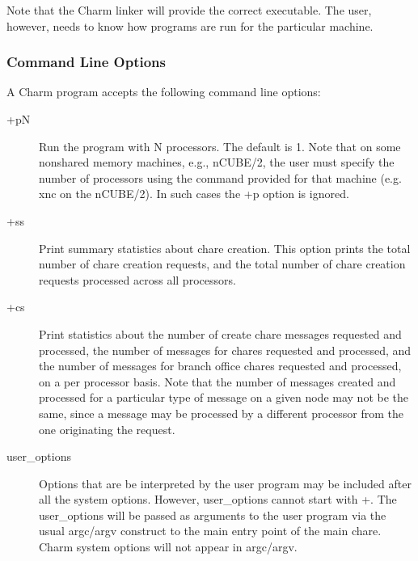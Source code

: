 Note that the Charm linker will provide the correct 
executable. The user, however, needs to know how programs are run for
the particular machine.

\subsubsection[Command Line Options]{Command Line Options}
\label{command line options}

A Charm program accepts the following command line options:
\begin{description}

\item[{\fexec +pN}] Run the program with N processors. The default is 1.
Note that on some nonshared memory machines, e.g., nCUBE/2, the user must
specify the number of processors using the command provided for that
machine (e.g. {\fexec xnc} on the nCUBE/2).
In such cases the {\fexec +p} option is ignored.



\item[{\fexec +ss}] Print summary statistics about chare creation.  This option
prints the total number of chare creation requests, and the total number of
chare creation requests processed across all processors.

\item[{\fexec +cs}] Print statistics about the number of create chare messages
requested and processed, the number of messages for chares requested and 
processed, and the number of messages for branch office chares requested and
processed, on a per processor basis.  Note that the number of messages 
created and processed for a particular type of message on a given node 
may not be the same, since a message may be processed by a different
processor from the one originating the request.


\item[{\fexec user\_options}] Options that are be interpreted by the user
program may be included after all the system options. 
However, {\fexec user\_options} cannot start with +.
The {\fexec user\_options} will be passed as arguments to the user program 
via the usual {\fcmd argc/argv} construct to the {\fcmd main}
entry point of the main chare. 
Charm system options will not appear in {\fcmd argc/argv}.

\end{description}

